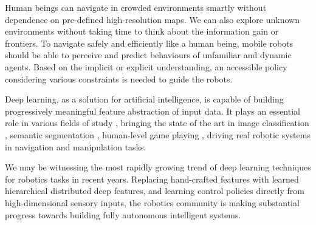 Human beings can navigate in crowded environments smartly without dependence on pre-defined high-resolution maps. We can also explore unknown environments without taking time to think about the information gain or frontiers. To navigate safely and efficiently like a human being, mobile robots should be able to perceive and predict behaviours of unfamiliar and dynamic agents. Based on the implicit or explicit understanding, an accessible policy considering various constraints is needed to guide the robots.


Deep learning, as a solution for artificial intelligence, is capable of building progressively meaningful feature abstraction of input data.
It plays an essential role in various fields of study \cite{Goodfellow-et-al-2016}, bringing the state of the art in image classification \cite{he2016deep,huang2017densely, krizhevsky2012imagenet},
semantic segmentation \cite{chen2016deeplab, long2015fully},
human-level game playing \cite{mnih2016asynchronous, mnih2015human}, driving real robotic systems in navigation \cite{tai2017virtual, zhang2017deep, zhu2017target}
and manipulation \cite{levine2016end,yu2018one} tasks.

We may be witnessing the most rapidly growing trend of deep learning techniques for robotics tasks in recent years.
Replacing hand-crafted features with learned hierarchical distributed deep features, and learning control policies directly from high-dimensional sensory inputs, the robotics community is making substantial progress towards building fully autonomous intelligent systems.
